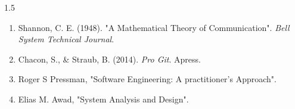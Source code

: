 \documentclass[12pt, a4paper, oneside]{report}
\begin{document}
\begin{spacing}{1.5}
\begin{enumerate}
    \item Shannon, C. E. (1948). "A Mathematical Theory of Communication". \textit{Bell System Technical Journal}.
    \item Chacon, S., \& Straub, B. (2014). \textit{Pro Git}. Apress.
    \item Roger S Pressman, "Software Engineering: A practitioner's Approach".
    \item Elias M. Awad, "System Analysis and Design".
\end{enumerate}
\end{spacing}
\end{document}
